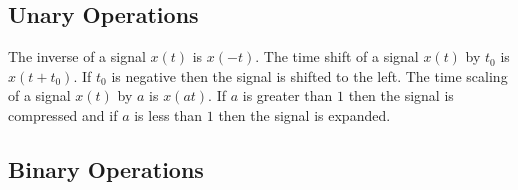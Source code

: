 \documentclass{report}
\begin{document}
\subsection{Unary Operations}

\begin{description}
	\ii[Inverse] The inverse of a signal $x(t)$ is $x(-t)$.
	 The time shift of a signal $x(t)$ by $t_0$ is $x(t+t_0)$. If $t_0$ is negative then the signal is shifted to the left.
	 The time scaling of a signal $x(t)$ by $a$ is $x(at)$. If $a$ is greater than $1$ then the signal is compressed and if $a$ is less than $1$ then the signal is expanded.
\end{description}


\subsection{Binary Operations}
\end{document}
